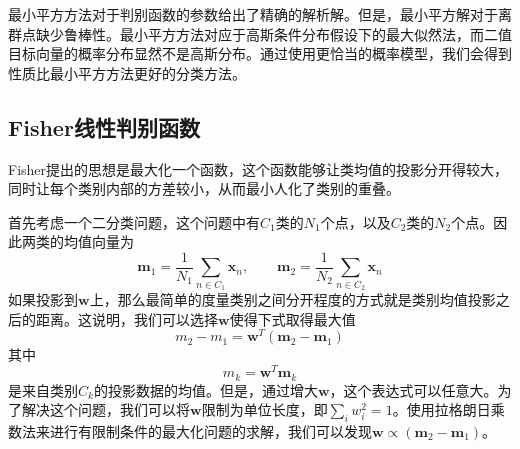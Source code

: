 最小平方方法对于判别函数的参数给出了精确的解析解。但是，最小平方解对于离群点缺少鲁棒性。最小平方方法对应于高斯条件分布假设下的最大似然法，而二值目标向量的概率分布显然不是高斯分布。通过使用更恰当的概率模型，我们会得到性质比最小平方方法更好的分类方法。
\subsection*{Fisher线性判别函数}
Fisher提出的思想是最大化一个函数，这个函数能够让类均值的投影分开得较大，同时让每个类别内部的方差较小，从而最小人化了类别的重叠。

首先考虑一个二分类问题，这个问题中有$C_1$类的$N_1$个点，以及$C_2$类的$N_2$个点。因此两类的均值向量为
\begin{equation}
\label{kka}
	\boldsymbol{m}_1=\frac{1}{N_1}\sum_{n\in C_1}\boldsymbol{x}_n,\qquad \boldsymbol{m}_2=\frac{1}{N_2}\sum_{n\in C_2}\boldsymbol{x}_n
\end{equation}
如果投影到$\boldsymbol{w}$上，那么最简单的度量类别之间分开程度的方式就是类别均值投影之后的距离。这说明，我们可以选择$\boldsymbol{w}$使得下式取得最大值
\begin{equation}
	m_2-m_1=\boldsymbol{w}^T(\boldsymbol{m}_2-\boldsymbol{m}_1)
\end{equation}
其中
\begin{equation}
\label{kkb}
	m_k=\boldsymbol{w}^T\boldsymbol{m}_k
\end{equation}
是来自类别$C_k$的投影数据的均值。但是，通过增大$\boldsymbol{w}$，这个表达式可以任意大。为了解决这个问题，我们可以将$\boldsymbol{w}$限制为单位长度，即$\sum_iw_i^2=1$。使用拉格朗日乘数法来进行有限制条件的最大化问题的求解，我们可以发现$\boldsymbol{w}\propto (\boldsymbol{m}_2-\boldsymbol{m}_1)$。

